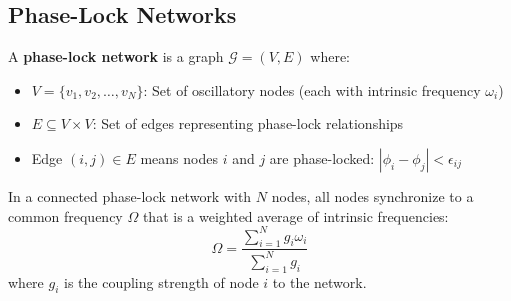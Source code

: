 \subsection{Phase-Lock Networks}

\begin{definition}
\label{def:phase_lock_network}
A \textbf{phase-lock network} is a graph $\mathcal{G} = (V, E)$ where:
\begin{itemize}
\item $V = \{v_1, v_2, \ldots, v_N\}$: Set of oscillatory nodes (each with intrinsic frequency $\omega_i$)
\item $E \subseteq V \times V$: Set of edges representing phase-lock relationships
\item Edge $(i,j) \in E$ means nodes $i$ and $j$ are phase-locked: $|\phi_i - \phi_j| < \epsilon_{ij}$
\end{itemize}
\end{definition}

\begin{theorem}
\label{thm:network_coherence}
In a connected phase-lock network with $N$ nodes, all nodes synchronize to a common frequency $\Omega$ that is a weighted average of intrinsic frequencies:
\begin{equation}
\Omega = \frac{\sum_{i=1}^{N} g_i \omega_i}{\sum_{i=1}^{N} g_i}
\end{equation}
where $g_i$ is the coupling strength of node $i$ to the network.
\end{theorem}

